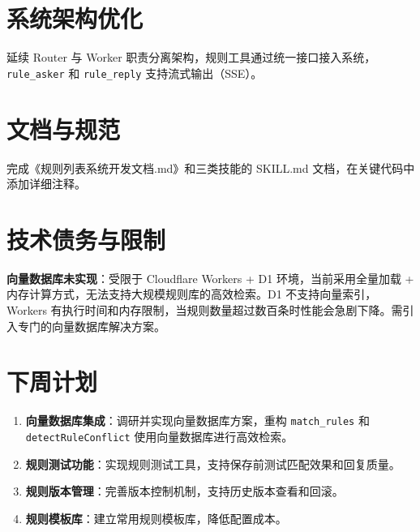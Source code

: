 \documentclass[UTF8]{ctexart}
\begin{document}
\section{系统架构优化}

延续 Router 与 Worker 职责分离架构，规则工具通过统一接口接入系统，\texttt{rule\_asker} 和 \texttt{rule\_reply} 支持流式输出（SSE）。

\section{文档与规范}

完成《规则列表系统开发文档.md》和三类技能的 SKILL.md 文档，在关键代码中添加详细注释。

\section{技术债务与限制}

\textbf{向量数据库未实现}：受限于 Cloudflare Workers + D1 环境，当前采用全量加载 + 内存计算方式，无法支持大规模规则库的高效检索。D1 不支持向量索引，Workers 有执行时间和内存限制，当规则数量超过数百条时性能会急剧下降。需引入专门的向量数据库解决方案。

\section{下周计划}

\begin{enumerate}
    \item \textbf{向量数据库集成}：调研并实现向量数据库方案，重构 \texttt{match\_rules} 和 \texttt{detectRuleConflict} 使用向量数据库进行高效检索。
    \item \textbf{规则测试功能}：实现规则测试工具，支持保存前测试匹配效果和回复质量。
    \item \textbf{规则版本管理}：完善版本控制机制，支持历史版本查看和回滚。
    \item \textbf{规则模板库}：建立常用规则模板库，降低配置成本。
\end{enumerate}
\end{document}
